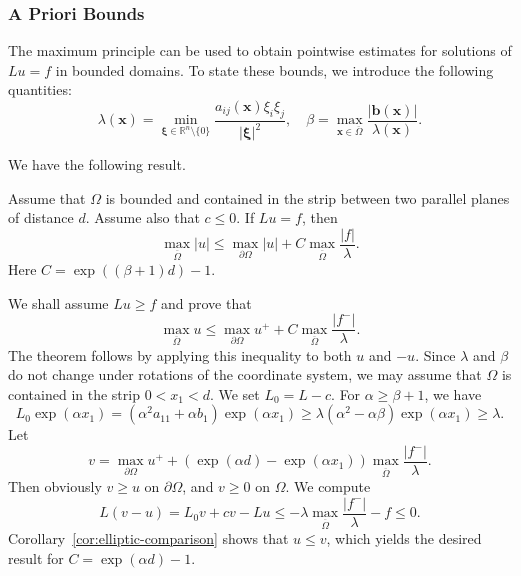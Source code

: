 \subsubsection{A Priori Bounds}\label{subsec:elliptic-a-priori-bounds}

The maximum principle can be used to obtain pointwise estimates for solutions of $Lu=f$ in bounded domains. To state these bounds, we introduce the following quantities:
\begin{equation}\label{eq:elliptic-pointwise-ellipticity-and-drift}
\lambda(\bm{x})=\min_{\bm{\xi}\in\mathbb{R}^n\setminus\{0\}}\dfrac{a_{ij}(\bm{x})\xi_i\xi_j}{|\bm{\xi}|^2},\quad\beta=\max_{\bm{x}\in\overline\Omega}\dfrac{|\bm{b}(\bm{x})|}{\lambda(\bm{x})}.
\end{equation}


We have the following result.

\begin{Theorem}
\label{thm:elliptic-strip-a-priori-bound}
Assume that $\Omega$ is bounded and contained in the strip between two parallel planes of distance $d$. Assume also that $c\leq0$. If $Lu=f$, then
\begin{equation}\label{eq:elliptic-strip-a-priori-bound}
\max_{\overline\Omega}|u|\leq\max_{\partial\Omega}|u|+C\max_{\overline\Omega}\dfrac{|f|}{\lambda}.
\end{equation}
Here $C=\exp((\beta+1)d)-1$.
\end{Theorem}

\begin{Proof}
We shall assume $Lu\geq f$ and prove that
\begin{equation}\label{eq:elliptic-strip-upper-bound}
\max_{\overline\Omega}u\leq\max_{\partial\Omega}u^++C\max_{\overline\Omega}\dfrac{|f^-|}{\lambda}.
\end{equation}
The theorem follows by applying this inequality to both $u$ and $-u$. Since $\lambda$ and $\beta$ do not change under rotations of the coordinate system, we may assume that $\Omega$ is contained in the strip $0<x_1<d$. We set $L_0=L-c$. For $\alpha\geq\beta+1$, we have
\begin{equation}\label{eq:elliptic-strip-exponential-barrier}
L_0\exp(\alpha x_1)=(\alpha^2a_{11}+\alpha b_1)\exp(\alpha x_1)\geq\lambda(\alpha^2-\alpha\beta)\exp(\alpha x_1)\geq\lambda.
\end{equation}
Let
\begin{equation}\label{eq:elliptic-strip-comparison-function}
v=\max_{\partial\Omega}u^++(\exp(\alpha d)-\exp(\alpha x_1))\max_{\overline\Omega}\dfrac{|f^-|}{\lambda}.
\end{equation}
Then obviously $v\geq u$ on $\partial\Omega$, and $v\geq0$ on $\Omega$. We compute
\begin{equation}\label{eq:elliptic-strip-comparison-inequality}
L(v-u)=L_0v+cv-Lu\leq-\lambda\max_{\overline\Omega}\dfrac{|f^-|}{\lambda}-f\leq0.
\end{equation}
Corollary~\ref{cor:elliptic-comparison} shows that $u\leq v$, which yields the desired result for $C=\exp(\alpha d)-1$.
\end{Proof}

